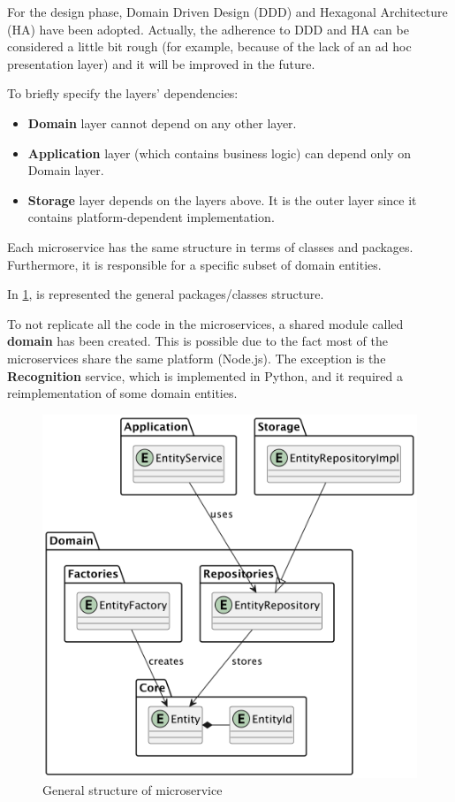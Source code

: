 \documentclass{scrartcl}
\begin{document}
    For the design phase, Domain Driven Design (DDD) and Hexagonal Architecture (HA) have been adopted.
    Actually, the adherence to DDD and HA can be considered a little bit rough (for example, because of the lack of an ad hoc presentation layer) and it will be improved in the future.

    To briefly specify the layers' dependencies:
    \begin{itemize}
        \item \textbf{Domain} layer cannot depend on any other layer.
        \item \textbf{Application} layer (which contains business logic) can depend only on Domain layer.
        \item \textbf{Storage} layer depends on the layers above.
        It is the outer layer since it contains platform-dependent implementation.
    \end{itemize}

    Each microservice has the same structure in terms of classes and packages.
    Furthermore, it is responsible for a specific subset of domain entities.

    In \cref{fig:general-structure}, is represented the general packages/classes structure.

    To not replicate all the code in the microservices, a shared module called \textbf{domain} has been created.
    This is possible due to the fact most of the microservices share the same platform (Node.js).
    The exception is the \textbf{Recognition} service, which is implemented in Python, and it required a reimplementation of some domain entities.

    \begin{figure}
        \centering
        \includegraphics[scale=0.55]{img/general-structure}
        \caption{General structure of microservice}
        \label{fig:general-structure}
    \end{figure}
\end{document}
